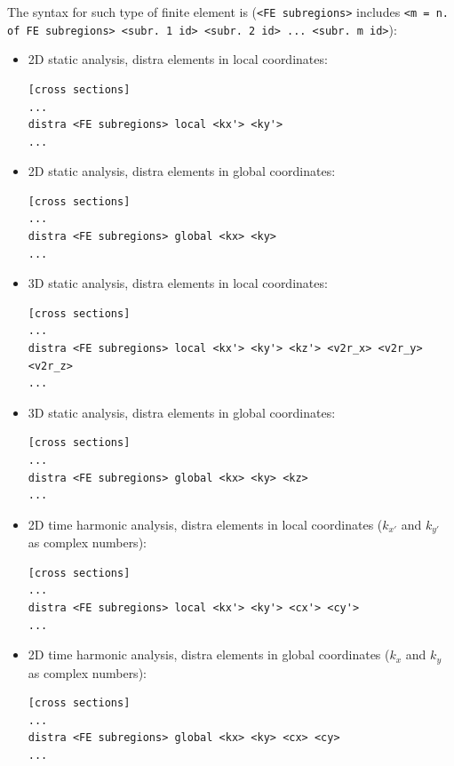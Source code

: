 \documentclass[a4paper,fleqn]{book}
\begin{document}
The syntax for such type of finite element is (\texttt{<FE subregions>} includes \texttt{<m = n. of FE subregions> <subr. 1 id> <subr. 2 id> ... <subr. m id>}):
\begin{itemize}

\item 2D static analysis, distra elements in local coordinates:
\begin{Verbatim}[frame=single, fontsize=\small, label={format of section [cross sections] for distra elements}]
[cross sections]
...
distra <FE subregions> local <kx'> <ky'>
...
\end{Verbatim} 

\item 2D static analysis, distra elements in global coordinates:
\begin{Verbatim}[frame=single, fontsize=\small, label={format of section [cross sections] for distra elements}]
[cross sections]
...
distra <FE subregions> global <kx> <ky>
...
\end{Verbatim} 

\item 3D static analysis, distra elements in local coordinates:
\begin{Verbatim}[frame=single, fontsize=\small, label={format of section [cross sections] for distra elements}]
[cross sections]
...
distra <FE subregions> local <kx'> <ky'> <kz'> <v2r_x> <v2r_y> <v2r_z>
...
\end{Verbatim}

\item 3D static analysis, distra elements in global coordinates:
\begin{Verbatim}[frame=single, fontsize=\small, label={format of section [cross sections] for distra elements}]
[cross sections]
...
distra <FE subregions> global <kx> <ky> <kz>
...
\end{Verbatim}

\item 2D time harmonic analysis, distra elements in local coordinates ($k_{x'}$ and $k_{y'}$ as complex numbers):
\begin{Verbatim}[frame=single, fontsize=\small, label={format of section [cross sections] for distra elements}]
[cross sections]
...
distra <FE subregions> local <kx'> <ky'> <cx'> <cy'>
...
\end{Verbatim} 

\item 2D time harmonic analysis, distra elements in global coordinates ($k_{x}$ and $k_{y}$ as complex numbers):
\begin{Verbatim}[frame=single, fontsize=\small, label={format of section [cross sections] for distra elements}]
[cross sections]
...
distra <FE subregions> global <kx> <ky> <cx> <cy>
...
\end{Verbatim}


\end{itemize}
\end{document}
